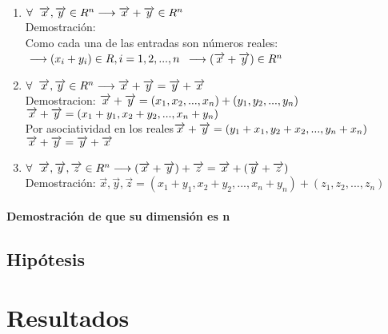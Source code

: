 \documentclass{book}
\begin{document}
\begin{enumerate}
    \item $\forall \hspace*{0.2cm}\overrightarrow{x},\overrightarrow{y}\in R^n \longrightarrow \overrightarrow{x}+\overrightarrow{y}\in R^n$
    \\Demostración:
    \\Como cada una de las entradas son números reales:
    $\\\longrightarrow(x_{i}+y_{i})\in R, i=1,2,...,n$
    $\\\longrightarrow (\overrightarrow{x}+\overrightarrow{y})\in R^n$

    \item $\forall \hspace{0.2 cm}\overrightarrow{x}, \overrightarrow{y} \in R^n \longrightarrow \overrightarrow{x}+\overrightarrow{y}=\overrightarrow{y}+\overrightarrow{x}$
    \\Demostracion:
    $\\\overrightarrow{x}+\overrightarrow{y}=(x_{1},x_{2},...,x_{n})+(y_{1},y_{2},...,y_{n})$
    $\\\overrightarrow{x}+\overrightarrow{y}=(x_{1}+y_{1},x_{2}+y_{2},...,x_{n}+y_{n})$
    \\Por asociatividad en los reales$\\\overrightarrow{x}+\overrightarrow{y}=(y_{1}+x_{1},y_{2}+x_{2},...,y_{n}+x_{n})$
    $\\\overrightarrow{x}+\overrightarrow{y}=\overrightarrow{y}+\overrightarrow{x}$
    \item $\forall \hspace*{0.2cm}\overrightarrow{x},\overrightarrow{y},\overrightarrow{z}\in R^n \longrightarrow (\overrightarrow{x}+\overrightarrow{y})+\overrightarrow{z}=\overrightarrow{x}+(\overrightarrow{y}+\overrightarrow{z})$
    \\Demostración: 
    $\overrightarrow{x},\overrightarrow{y},\overrightarrow{z}=(x_{1}+y_{1},x_{2}+y_{2},...,x_{n}+y_{n})+(z_{1},z_{2},...,z_{n})$

\end{enumerate}
\subsubsection{Demostración de que su dimensión es n}
\section{Hipótesis}
\chapter{Resultados}
\end{document}
